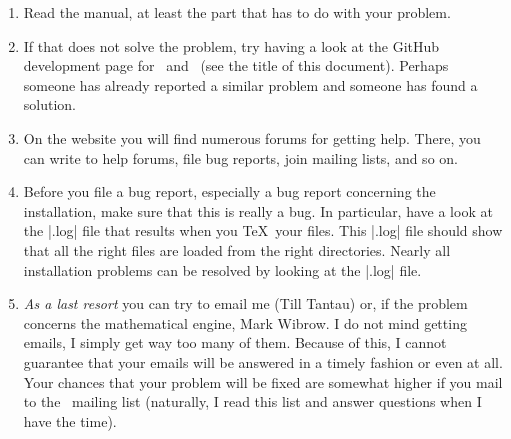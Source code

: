 \begin{paracol}{2}
\begin{enumerate}
    \item Read the manual, at least the part that has to do with your
        problem.
    \item If that does not solve the problem, try having a look at the
        GitHub development page for \pgfname\ and \tikzname\ (see the
        title of this document). Perhaps someone has already reported a
        similar problem and someone has found a solution.
    \item On the website you will find numerous forums for getting help.
        There, you can write to help forums, file bug reports, join mailing
        lists, and so on.
    \item Before you file a bug report, especially a bug report concerning
        the installation, make sure that this is really a bug. In particular,
        have a look at the |.log| file that results when you \TeX\ your
        files. This |.log| file should show that all the right files are
        loaded from the right directories. Nearly all installation problems
        can be resolved by looking at the |.log| file.
    \item \emph{As a last resort} you can try to email me (Till Tantau) or,
        if the problem concerns the mathematical engine, Mark Wibrow. I do
        not mind getting emails, I simply get way too many of them. Because
        of this, I cannot guarantee that your emails will be answered in a 
        timely fashion or even at all. Your chances that your problem will
        be fixed are somewhat higher if you mail to the \pgfname\ mailing
        list (naturally, I read this list and answer questions when I have
        the time).
\end{enumerate}

\end{paracol}